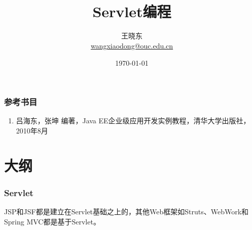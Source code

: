 
\title[KevinW@OUC]{\\  
 Servlet编程}
\author[王晓东]{王晓东\\
  \href{mailto:wangxiaodong@ouc.edu.cn}{\footnotesize wangxiaodong@ouc.edu.cn}}
\date{\today}


 \frame{\titlepage}

\begin{frame}
\frametitle{参考书目}
\begin{enumerate}
\item 吕海东，张坤 编著，Java EE企业级应用开发实例教程，清华大学出版社，2010年8月
\end{enumerate}  
\end{frame}


\section*{大纲}

\begin{frame}
\frametitle{Servlet} 

JSP和JSF都是建立在Servlet基础之上的，其他Web框架如Struts、WebWork和Spring MVC都是基于Servlet。

\end{frame}

